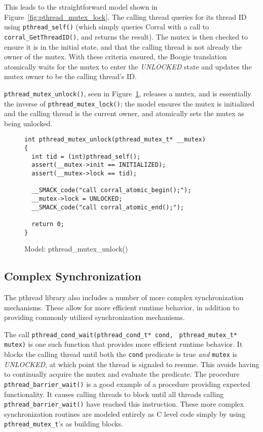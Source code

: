 This leads to the straightforward model shown in
Figure~\ref{fig:pthread_mutex_lock}. The calling thread queries for
its thread ID using \lstinline|pthread_self()| (which simply queries
Corral with a call to \lstinline|corral_GetThreadID()|, and returns
the result). The mutex is then checked to ensure it is in the initial
state, and that the calling thread is not already the owner of the 
mutex.  With these criteria ensured, the Boogie translation atomically
waits for the mutex to enter the \emph{UNLOCKED} state and updates the
mutex owner to be the calling thread's ID.

\lstinline|pthread_mutex_unlock()|, seen in
Figure~\ref{fig:pthread_mutex_unlock}, releases a mutex, and is
essentially the inverse of \lstinline|pthread_mutex_lock()|; the model
ensures the mutex is initialized and the calling thread is the current
owner, and atomically sets the mutex as being unlocked. 

\begin{figure}[h]
\centering
\caption{Model: pthread\_mutex\_unlock()}
\label{fig:pthread_mutex_unlock}
\begin{lstlisting}
int pthread_mutex_unlock(pthread_mutex_t* __mutex)
{
  int tid = (int)pthread_self();
  assert(__mutex->init == INITIALIZED);
  assert(__mutex->lock == tid);

  __SMACK_code("call corral_atomic_begin();");
  __mutex->lock = UNLOCKED;
  __SMACK_code("call corral_atomic_end();");

  return 0;
}
\end{lstlisting}
\end{figure}

\subsection{Complex Synchronization}
The pthread library also includes a number of more complex
synchronization mechanisms.  These allow for more efficient runtime
behavior, in addition to providing commonly utilized synchronization
mechanisms.

The call \lstinline|pthread_cond_wait(pthread_cond_t* cond, |
\lstinline|pthread_mutex_t* mutex)|  is one such function that
provides more efficient runtime behavior.  It blocks the calling
thread until both the \lstinline|cond| predicate is true \emph{and}
\lstinline|mutex| is \emph{UNLOCKED}, at which point the thread is
signaled to resume. This avoids having to continually acquire the
mutex and evaluate the predicate.  The procedure
\lstinline|pthread_barrier_wait()| is a good example of a procedure
providing expected functionality.  It causes calling threads to block
until all threads calling \lstinline|pthread_barrier_wait()| have
reached this instruction. These more complex synchronization routines
are modeled entirely as C level code simply by using
\lstinline|pthread_mutex_t|'s as building blocks. 


